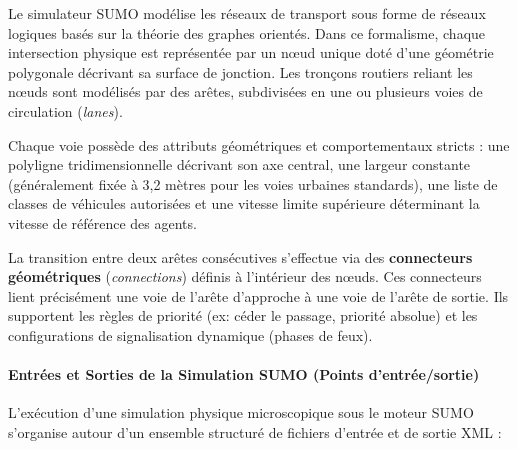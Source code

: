 \documentclass[10pt, a4paper]{article}
\begin{document}
Le simulateur SUMO modélise les réseaux de transport sous forme de
réseaux logiques basés sur la théorie des graphes orientés. Dans ce
formalisme, chaque intersection physique est représentée par un nœud
unique doté d'une géométrie polygonale décrivant sa surface de jonction.
Les tronçons routiers reliant les nœuds sont modélisés par des arêtes,
subdivisées en une ou plusieurs voies de circulation (\emph{lanes}).

Chaque voie possède des attributs géométriques et comportementaux
stricts : une polyligne tridimensionnelle décrivant son axe central, une
largeur constante (généralement fixée à 3,2 mètres pour les voies
urbaines standards), une liste de classes de véhicules autorisées et une
vitesse limite supérieure déterminant la vitesse de référence des
agents.

La transition entre deux arêtes consécutives s'effectue via des
\textbf{connecteurs géométriques} (\emph{connections}) définis à
l'intérieur des nœuds. Ces connecteurs lient précisément une voie de
l'arête d'approche à une voie de l'arête de sortie. Ils supportent les
règles de priorité (ex: céder le passage, priorité absolue) et les
configurations de signalisation dynamique (phases de feux).

\paragraph{Entrées et Sorties de la Simulation SUMO (Points
d'entrée/sortie)}\label{entruxe9es-et-sorties-de-la-simulation-sumo-points-dentruxe9esortie}

L'exécution d'une simulation physique microscopique sous le moteur SUMO
s'organise autour d'un ensemble structuré de fichiers d'entrée et de
sortie XML :
\end{document}
